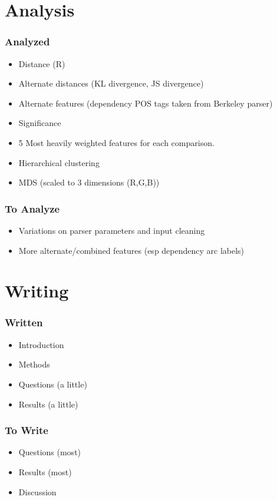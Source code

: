 \documentclass{beamer}
\begin{document}
\section{Analysis}
\begin{frame}
\frametitle{Analyzed}
\begin{itemize}
\item Distance (R)
\item Alternate distances (KL divergence, JS divergence)
\item Alternate features (dependency POS tags taken from Berkeley
  parser)
\item Significance
\item 5 Most heavily weighted features for each comparison.
\item Hierarchical clustering
\item MDS (scaled to 3 dimensions (R,G,B))
\end{itemize}
\end{frame}

\begin{frame}
\frametitle{To Analyze}
\begin{itemize}
\item Variations on parser parameters and input cleaning
\item More alternate/combined features (esp dependency arc labels)
\end{itemize}
\end{frame}


\section{Writing}
\begin{frame}
\frametitle{Written}
\begin{itemize}
\item Introduction
\item Methods
\item Questions (a little)
\item Results (a little)
\end{itemize}
\end{frame}

\begin{frame}
\frametitle{To Write}
\begin{itemize}
\item Questions (most)
\item Results (most)
\item Discussion
\end{itemize}
\end{frame}
\end{document}
